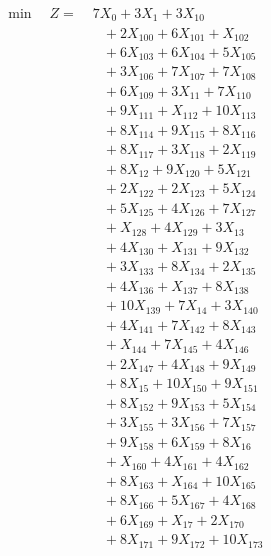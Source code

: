 \documentclass[a4paper,10pt]{article}
\begin{document}
\allowdisplaybreaks
{\small
\begin{align}
\min \quad Z = &\; 7X_{0} + 3X_{1} + 3X_{10} \\[0.5ex]
&\quad  + 2X_{100} + 6X_{101} + X_{102} \\[0.5ex]
&\quad  + 6X_{103} + 6X_{104} + 5X_{105} \\[0.5ex]
&\quad  + 3X_{106} + 7X_{107} + 7X_{108} \\[0.5ex]
&\quad  + 6X_{109} + 3X_{11} + 7X_{110} \\[0.5ex]
&\quad  + 9X_{111} + X_{112} + 10X_{113} \\[0.5ex]
&\quad  + 8X_{114} + 9X_{115} + 8X_{116} \\[0.5ex]
&\quad  + 8X_{117} + 3X_{118} + 2X_{119} \\[0.5ex]
&\quad  + 8X_{12} + 9X_{120} + 5X_{121} \\[0.5ex]
&\quad  + 2X_{122} + 2X_{123} + 5X_{124} \\[0.5ex]
&\quad  + 5X_{125} + 4X_{126} + 7X_{127} \\[0.5ex]
&\quad  + X_{128} + 4X_{129} + 3X_{13} \\[0.5ex]
&\quad  + 4X_{130} + X_{131} + 9X_{132} \\[0.5ex]
&\quad  + 3X_{133} + 8X_{134} + 2X_{135} \\[0.5ex]
&\quad  + 4X_{136} + X_{137} + 8X_{138} \\[0.5ex]
&\quad  + 10X_{139} + 7X_{14} + 3X_{140} \\[0.5ex]
&\quad  + 4X_{141} + 7X_{142} + 8X_{143} \\[0.5ex]
&\quad  + X_{144} + 7X_{145} + 4X_{146} \\[0.5ex]
&\quad  + 2X_{147} + 4X_{148} + 9X_{149} \\[0.5ex]
&\quad  + 8X_{15} + 10X_{150} + 9X_{151} \\[0.5ex]
&\quad  + 8X_{152} + 9X_{153} + 5X_{154} \\[0.5ex]
&\quad  + 3X_{155} + 3X_{156} + 7X_{157} \\[0.5ex]
&\quad  + 9X_{158} + 6X_{159} + 8X_{16} \\[0.5ex]
&\quad  + X_{160} + 4X_{161} + 4X_{162} \\[0.5ex]
&\quad  + 8X_{163} + X_{164} + 10X_{165} \\[0.5ex]
&\quad  + 8X_{166} + 5X_{167} + 4X_{168} \\[0.5ex]
&\quad  + 6X_{169} + X_{17} + 2X_{170} \\[0.5ex]
&\quad  + 8X_{171} + 9X_{172} + 10X_{173} \\[0.5ex]

\end{align}}
\end{document}
